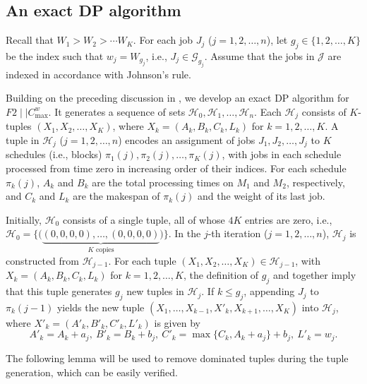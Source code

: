 ﻿\documentclass[12pt]{article} \textheight=24.5cm \textwidth=16.5cm \parskip = 0.165cm
\begin{document}
\begin{sloppypar}
        \subsection{An exact DP algorithm} \label{sec:dp}

        Recall that $W_1 >W_2 > \cdots W_K$.
        For each job $J_j$ ($j=1, 2, \ldots, n$), let $g_j \in \{1, 2, \ldots, K\}$ be the index such that $w_j=W_{g_j}$, i.e., $J_j\in\mathcal{G}_{g_j}$.
        Assume that the jobs in $\mathcal{J}$ are indexed in accordance with Johnson's rule.

        Building on the preceding discussion in , we develop an exact DP algorithm for $F2 \mid \mid C_{\max}^w$.
        It generates a sequence of sets $\mathcal{H}_0, \mathcal{H}_1, \ldots, \mathcal{H}_n$.
        Each $\mathcal{H}_j$ consists of $K$-tuples $(X_1, X_2, \ldots, X_K)$, where $X_k=(A_k, B_k, C_k, L_k)$ for $k=1, 2, \ldots, K$.
        A tuple in $\mathcal{H}_j$ ($j=1, 2, \ldots, n$) encodes an assignment of jobs $J_1, J_2, \ldots, J_j$ to $K$ schedules (i.e., blocks) $\pi_1(j), \pi_2(j), \ldots, \pi_K(j)$, with jobs in each schedule processed from time zero in increasing order of their indices.
        For each schedule $\pi_k(j)$, $A_k$ and $B_k$ are the total processing times on $M_1$ and $M_2$, respectively, and $C_k$ and $L_k$ are the makespan of $\pi_k(j)$ and the weight of its last job.

        Initially, $\mathcal{H}_0$ consists of a single tuple, all of whose $4K$ entries are zero, i.e., $\mathcal{H}_0=\{\Big (\underbrace{(0,0,0,0),\ldots,(0,0,0,0)}_{K\text{ copies}}\Big)\}$.
        In the $j$-th iteration ($j=1, 2, \ldots, n$), $\mathcal{H}_j$ is constructed from $\mathcal{H}_{j-1}$.
        For each tuple $(X_1, X_2, \ldots, X_K) \in \mathcal{H}_{j-1}$, with $X_k=(A_k, B_k, C_k, L_k)$ for $k=1, 2, \ldots, K$, the definition of $g_j$ and  together imply that this tuple generates $g_j$ new tuples in $\mathcal{H}_j$.
        If $k \leq g_j$, appending $J_j$ to $\pi_k(j-1)$ yields the new tuple $(X_1, \ldots, X_{k-1}, X'_k, X_{k+1}, \ldots, X_K)$ into $\mathcal{H}_j$, where $X'_k=(A'_k, B'_k, C'_k, L'_k)$ is given by
        \begin{equation} \label{eq-4.2: rec}
            A'_k=A_k+a_j, ~ B'_k=B_k+b_j, ~ C'_k=\max\{C_k, A_k + a_j \}+ b_j, ~ L'_k= w_j.
        \end{equation}

        The following lemma will be used to remove dominated tuples during the tuple generation, which can be easily verified.


\end{sloppypar}
\end{document}
